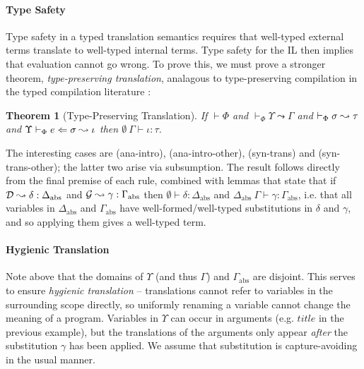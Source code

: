 \documentclass[10pt,preprint]{sigplanconf}
\newtheorem{theorem}{Theorem}
\newenvironment{proof-sketch}{\noindent{\emph{Proof Sketch.}}}{\qed}
\begin{document}
\paragraph{Type Safety}
Type safety in a typed translation semantics requires that well-typed external terms translate to well-typed internal terms. Type safety for the IL \cite{pfpl} then implies that evaluation cannot go wrong. To prove this, we must prove a stronger theorem, \emph{type-preserving translation}, analagous to type-preserving compilation in the typed compilation literature \cite{tarditi+:til-OLD}:%

\begin{theorem}[Type-Preserving Translation]
If $\vdash \Phi$ and $\vdash_\Phi \Upsilon \leadsto \Gamma$ and $\vdash_\Phi \sigma \leadsto \tau$ and $\Upsilon \vdash_{\Phi} e \Leftarrow \sigma \leadsto \iota$ then $\emptyset~\Gamma \vdash \iota : \tau$.
\end{theorem}
\begin{proof-sketch}
The interesting cases are (ana-intro), (ana-intro-other), (syn-trans) and (syn-trans-other); the latter two arise via subsumption. The result follows directly from the final premise of each rule, combined with lemmas that state that if $\mathcal{D} \leadsto \delta : \Delta_\text{abs}$ and $\mathcal{G} \leadsto \gamma : \Gamma_\text{abs}$ then $\emptyset \vdash \delta : \Delta_\text{abs}$ and $\Delta_\text{abs}~\Gamma \vdash \gamma : \Gamma_\text{abs}$, i.e. that all variables in $\Delta_\text{abs}$ and $\Gamma_\text{abs}$ have well-formed/well-typed substitutions in $\delta$ and $\gamma$,  and so applying them gives a well-typed term.
\end{proof-sketch}

\paragraph{Hygienic Translation} 
Note above that the domains of $\Upsilon$ (and thus $\Gamma$)  and $\Gamma_\text{abs}$ are disjoint. This serves to ensure \emph{hygienic translation} -- translations cannot refer to variables in the surrounding scope directly, so uniformly renaming a variable cannot change the meaning of a program. Variables in $\Upsilon$ can  occur in arguments (e.g. $title$ in the previous example), but the translations of the arguments only appear \emph{after} the substitution $\gamma$ has been applied. We assume that substitution is capture-avoiding in the usual manner. %
\end{document}
